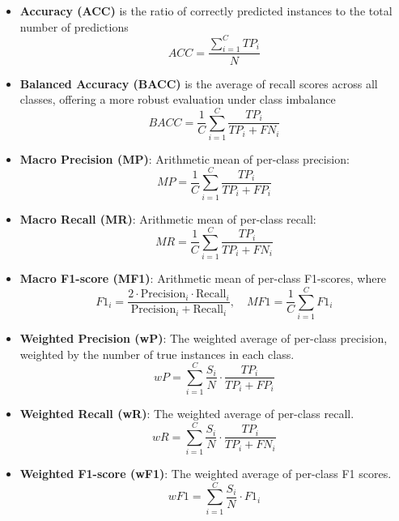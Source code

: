 \documentclass[journal,article,submit,moreauthors,pdftex]{Definitions/tsp}
\begin{document}
\begin{itemize}
    \item \textbf{Accuracy (ACC)} is the ratio of correctly predicted instances to the total number of predictions
    \begin{equation}
    \textit{ACC} = \frac{\sum_{i=1}^{C} TP_i}{N}
    \end{equation}
    \item \textbf{Balanced Accuracy (BACC)} is the average of recall scores across all classes, offering a more robust evaluation under class imbalance
    \begin{equation}
    \textit{BACC} = \frac{1}{C} \sum_{i=1}^{C} \frac{TP_i}{TP_i + FN_i}
    \end{equation}
    \item \textbf{Macro Precision (MP)}: Arithmetic mean of per-class precision:
    \begin{equation}
    \textit{MP} = \frac{1}{C} \sum_{i=1}^{C} \frac{TP_i}{TP_i + FP_i}
    \end{equation}
    \item \textbf{Macro Recall (MR)}: Arithmetic mean of per-class recall:
    \begin{equation}
    \textit{MR} = \frac{1}{C} \sum_{i=1}^{C} \frac{TP_i}{TP_i + FN_i}
    \end{equation}
    \item \textbf{Macro F1-score (MF1)}: Arithmetic mean of per-class F1-scores, where
    \begin{equation}
    \textit{F1}_i = \frac{2 \cdot \text{Precision}_i \cdot \text{Recall}_i}{\text{Precision}_i + \text{Recall}_i}, \quad
    \textit{MF1} = \frac{1}{C} \sum_{i=1}^{C} \textit{F1}_i
    \end{equation}
    
    \item \textbf{Weighted Precision (wP)}: The weighted average of per-class precision, weighted by the number of true instances in each class.
    \begin{equation}
    \textit{wP} = \sum_{i=1}^{C} \frac{S_i}{N} \cdot \frac{TP_i}{TP_i + FP_i}
    \end{equation}
    \item \textbf{Weighted Recall (wR)}: The weighted average of per-class recall.
    \begin{equation}
    \textit{wR} = \sum_{i=1}^{C} \frac{S_i}{N} \cdot \frac{TP_i}{TP_i + FN_i}
    \end{equation}
    \item \textbf{Weighted F1-score (wF1)}:  The weighted average of per-class F1 scores.
    \begin{equation}
    \textit{wF1} = \sum_{i=1}^{C} \frac{S_i}{N} \cdot \textit{F1}_i
    \end{equation}
\end{itemize}
\end{document}
